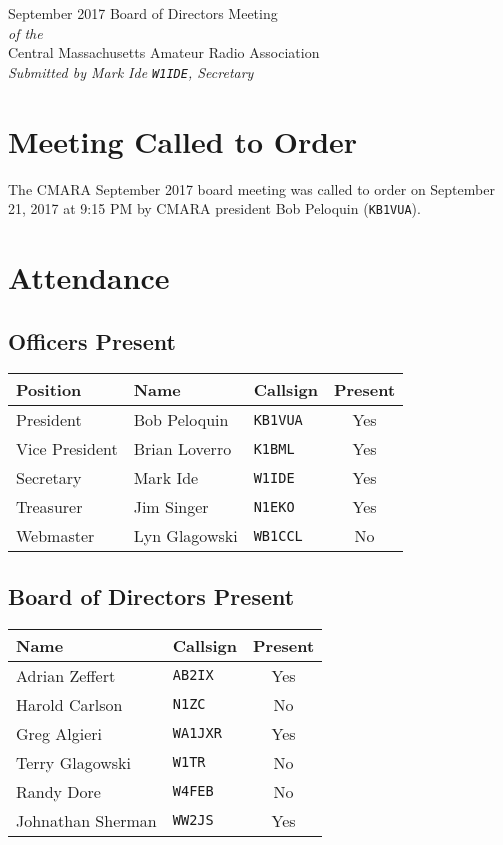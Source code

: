 \documentclass[10pt,letterpaper]{article}
\begin{document}
\begin{center}
{\huge September 2017 Board of Directors Meeting}\\
\emph{of the}\\
{\Large Central Massachusetts Amateur Radio Association}\\
\emph{Submitted by Mark Ide \texttt{W1IDE}, Secretary}
\end{center}

\section{Meeting Called to Order}
The CMARA September 2017 board meeting was called to order on September 21, 2017 at 9:15 PM by CMARA president Bob Peloquin (\texttt{KB1VUA}).

\section{Attendance}

\subsection{Officers Present}
\begin{tabular}{|l|l|l|c|}
  \hline
  \textbf{Position} & \textbf{Name}  & \textbf{Callsign} & \textbf{Present} \\ \hline
  President         & Bob Peloquin   & \texttt{KB1VUA}   & Yes \\
  Vice President    & Brian Loverro  & \texttt{K1BML}    & Yes \\
  Secretary         & Mark Ide       & \texttt{W1IDE}    & Yes \\
  Treasurer         & Jim Singer     & \texttt{N1EKO}    & Yes \\
  Webmaster         & Lyn Glagowski  & \texttt{WB1CCL}   & No  \\
  \hline
\end{tabular}

\subsection{Board of Directors Present}
\begin{tabular}{|l|l|c|}
  \hline
  \textbf{Name}     & \textbf{Callsign} & \textbf{Present} \\ \hline
  Adrian Zeffert    & \texttt{AB2IX}    & Yes \\
  Harold Carlson    & \texttt{N1ZC}     & No  \\
  Greg Algieri      & \texttt{WA1JXR}   & Yes \\
  Terry Glagowski   & \texttt{W1TR}     & No  \\
  Randy Dore        & \texttt{W4FEB}    & No  \\
  Johnathan Sherman & \texttt{WW2JS}    & Yes \\
  \hline
\end{tabular}
\end{document}

